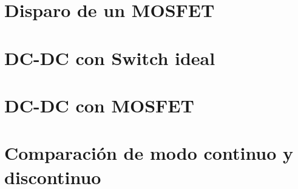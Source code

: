 







\tableofcontents
\newpage


\begin{multicols}{2}
\section{Disparo de un MOSFET}

\section{DC-DC con Switch ideal}

\section{DC-DC con MOSFET}

\section{Comparación de modo continuo y discontinuo}


\end{multicols}


